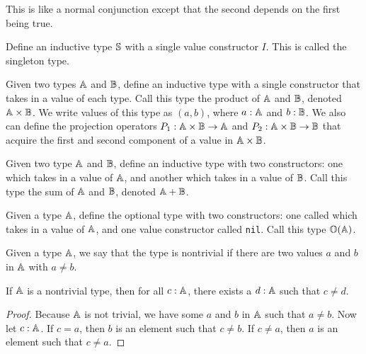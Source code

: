 \documentclass[../math.tex]{subfiles}
\begin{document}
This is like a normal conjunction except that the second \Prop depends on the
first \Prop being true.

\begin{definition}
    Define an inductive type $\S$ with a single value constructor $I$.  This is
    called the singleton type.
\end{definition}

\begin{definition}
    Given two types $\A$ and $\B$, define an inductive type with a single
    constructor that takes in a value of each type.  Call this type the product
    of $\A$ and $\B$, denoted $\A \times \B$.  We write values of this type as
    $(a, b)$, where $a : \A$ and $b : \B$.  We also can define the projection
    operators $P_1 : \A \times \B \rightarrow \A$ and $P_2 : \A \times \B
    \rightarrow \B$ that acquire the first and second component of a value in
    $\A \times \B$.
\end{definition}

\begin{definition}
    Given two type $\A$ and $\B$, define an inductive type with two
    constructors: one which takes in a value of $\A$, and another which takes in
    a value of $\B$.  Call this type the sum of $\A$ and $\B$, denoted $\A +
    \B$.
\end{definition}

\begin{definition}
    Given a type $\A$, define the optional type with two constructors: one
    called  which takes in a value of $\A$, and one value constructor
    called \verb|nil|.  Call this type $\O(\A)$.
\end{definition}

\begin{class}
    Given a type $\A$, we say that the type is nontrivial if there are two
    values $a$ and $b$ in $\A$ with $a \neq b$.
\end{class}

\begin{theorem} \label{not_trivial2}
    If $\A$ is a nontrivial type, then for all $c : \A$, there exists a $d : \A$
    such that $c \neq d$.
\end{theorem}
\begin{proof}
    Because $\A$ is not trivial, we have some $a$ and $b$ in $\A$ such that $a
    \neq b$.  Now let $c : \A$.  If $c = a$, then $b$ is an element such that $c
    \neq b$.  If $c \neq a$, then $a$ is an element such that $c \neq a$.
\end{proof}
\end{document}
